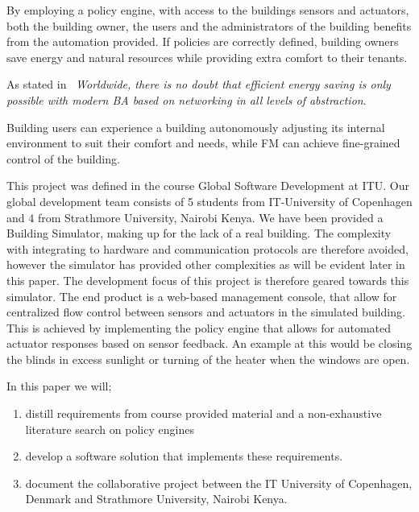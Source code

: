 
By employing a policy engine, with access to the buildings sensors and actuators, both the building owner, the users and the administrators of the building benefits from the automation provided. If policies are correctly defined, building owners save energy and natural resources while providing extra comfort to their tenants. 

As stated in~\cite{ba-short} \textit{Worldwide, there is no doubt that efficient energy saving is only possible with modern BA based on networking in all levels of abstraction}.

Building users can experience a building autonomously adjusting its internal environment to suit their comfort and needs, while FM can achieve fine-grained control of the building.

This project was defined in the course Global Software Development at ITU. Our global development team consists of 5 students from IT-University of Copenhagen and 4 from Strathmore University, Nairobi Kenya. We have been provided a Building Simulator, making up for the lack of a real building. The complexity with integrating to hardware and communication protocols are therefore avoided, however the simulator has provided other complexities as will be evident later in this paper. The development focus of this project is therefore geared towards this simulator. The end product is a web-based management console, that allow for centralized flow control between sensors and actuators in the simulated building. This is achieved by implementing the policy engine that allows for automated actuator responses based on sensor feedback. An example at this would be closing the blinds in excess sunlight or turning of the heater when the windows are open.

In this paper we will; 
\begin{enumerate}
	\item distill requirements from course provided material and a non-exhaustive literature search on policy engines
	\item develop a software solution that implements these requirements.
	\item document the collaborative project between the IT University of Copenhagen, Denmark and Strathmore University, Nairobi Kenya.
\end{enumerate}

